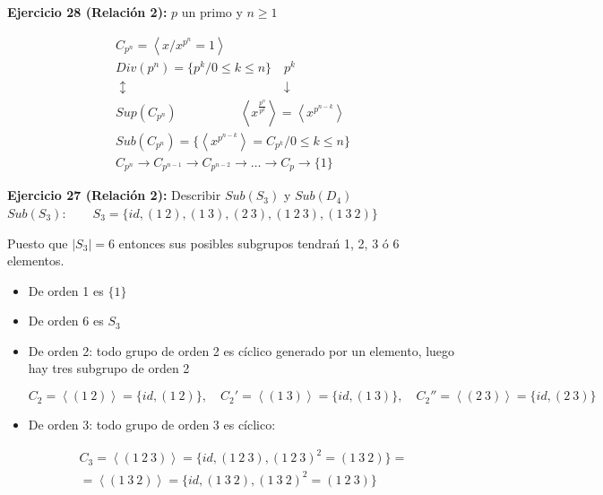 \documentclass{article}
\begin{document}
\textbf{Ejercicio 28 (Relación 2):} $p$ un primo y $n\geq 1$

\begin{gather*}
C_{p^n}=\left\langle x/x^{p^n}=1\right\rangle \\
Div(p^n)=\{p^k/0\leq k \leq n\} \quad p^k \\
\updownarrow \qquad\qquad\qquad\qquad\qquad\qquad \downarrow \\
Sup(C_{p^n}) \qquad\qquad\quad \left\langle x^{\frac{p^n}{p^k}} \right\rangle = \left\langle x^{p^{n-k}} \right\rangle \\
Sub(C_{p^n})=\{\left\langle x^{p^{n-k}} \right\rangle=C_{p^k} / 0\leq k \leq n\} \\
C_{p^n}\rightarrow C_{p^{n-1}}\rightarrow C_{p^{n-2}} \rightarrow \ldots \rightarrow C_p \rightarrow \{1\}
\end{gather*}

\textbf{Ejercicio 27 (Relación 2):} Describir $Sub(S_3)$ y $Sub(D_4)$ \\

$Sub(S_3): \qquad S_3=\{id,(1\:2),(1\:3),(2\:3),(1\:2\:3),(1\:3\:2)\}$

Puesto que $|S_3|=6$ entonces sus posibles subgrupos tendrań 1, 2, 3 ó 6 elementos.

\begin{itemize}
\item De orden 1 es $\{1\}$

\item De orden 6 es $S_3$ 

\item De orden 2: todo grupo de orden 2 es cíclico generado por un elemento, luego hay tres subgrupo de orden 2

\begin{equation*}
C_2=\left\langle (1\:2)\right\rangle = \{id, (1\:2)\},\quad C_2'=\left\langle (1\:3)\right\rangle=\{id,(1\:3)\},\quad C_2''=\left\langle(2\:3)\right\rangle = \{id,(2\:3)\}
\end{equation*}

\item De orden 3: todo grupo de orden 3 es cíclico:

\begin{gather*}
C_3=\left\langle (1\:2\:3)\right\rangle = \{id,(1\:2\:3),(1\:2\:3)^2=(1\:3\:2)\}=\\
=\left\langle (1\:3\:2)\right\rangle=\{id,(1\:3\:2),(1\:3\:2)^2=(1\:2\:3)\}
\end{gather*}
\end{itemize}
\end{document}
